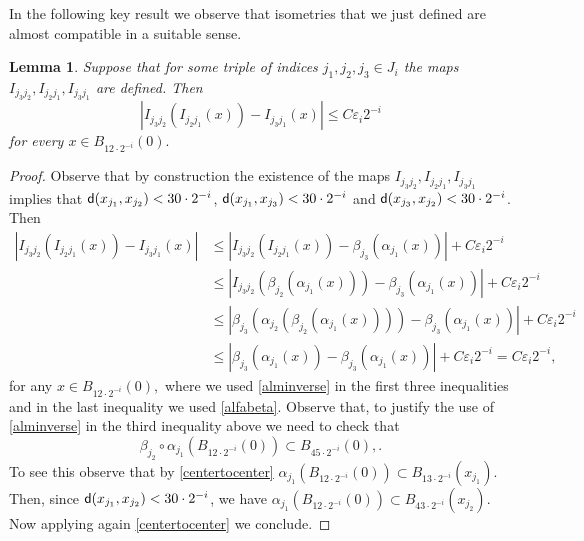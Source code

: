 \documentclass[11pt]{article}
\newcommand{\eps}{\varepsilon}
\newcommand{\sfd}{{\sf d}}
\theoremstyle{plain}
\newtheorem{lemma}[theorem]{Lemma}
\theoremstyle{definition}
\numberwithin{equation}{section}
\begin{document}
In the following key result we observe that isometries that we just defined are almost compatible in a suitable sense. 
\begin{lemma}\label{almcomp}
	 Suppose that for some triple of indices $j_1,j_2,j_3 \in J_i$ the maps $I_{j_3j_2},I_{j_2j_1},I_{j_3j_1}$ are defined.
	Then 
	\[|I_{j_3j_2}(I_{j_2j_1}(x))-I_{j_3j_1}(x)|\le  C\eps_i 2^{-i}\] 
	for every $x \in B_{12\cdot2^{-i}}(0).$
\end{lemma}
\begin{proof} 
	Observe that by construction the existence of the maps  $I_{j_3j_2},I_{j_2j_1},I_{j_3j_1}$  implies that $\sfd(x_{j_1},x_{j_2})<30\cdot 2^{-i}$, $\sfd(x_{j_1},x_{j_3})<30\cdot 2^{-i}$ and $\sfd(x_{j_3},x_{j_2})<30\cdot 2^{-i}$. Then
	\begin{align*}
		|I_{j_3j_2}(I_{j_2j_1}(x))-I_{j_3j_1}(x)|&\le |I_{j_3j_2}(I_{j_2j_1}(x))-\beta_{j_3}(\alpha_{j_1}(x))|+C \eps_i 2^{-i}\\
		&\le|I_{j_3j_2}(\beta_{j_2}(\alpha_{j_1}(x)))-\beta_{j_3}(\alpha_{j_1}(x))|+C \eps_i 2^{-i}\\
		&\le  |\beta_{j_3}(\alpha_{j_2}(\beta_{j_2}(\alpha_{j_1}(x))))-\beta_{j_3}(\alpha_{j_1}(x))|+C \eps_i 2^{-i}\\
		&\le |\beta_{j_3}(\alpha_{j_1}(x))-\beta_{j_3}(\alpha_{j_1}(x))|+C \eps_i 2^{-i}=C \eps_i 2^{-i},
	\end{align*}
	for any $x \in B_{12 \cdot 2^{-i}}(0),$ where we used \eqref{alminverse} in the first three inequalities and in the last inequality we used \eqref{alfabeta}. 
	Observe that, to justify the use of \eqref{alminverse} in the third inequality above we need to check that
	\[\beta_{j_2}\circ \alpha_{j_1}(B_{12\cdot 2^{-i}}(0))\subset B_{45 \cdot 2^{-i}}(0), .\] To see this observe that by \eqref{centertocenter} $\alpha_{j_1} (B_{12\cdot 2^{-i}}(0))\subset B_{13\cdot 2^{-i}}(x_{j_1})$. Then, since $\sfd(x_{j_1},x_{j_2})<30\cdot 2^{-i}$, we have $\alpha_{j_1} (B_{12\cdot 2^{-i}}(0))\subset B_{43\cdot 2^{-i}}(x_{j_2})$. Now applying again \eqref{centertocenter} we conclude.
\end{proof}	
\end{document}
